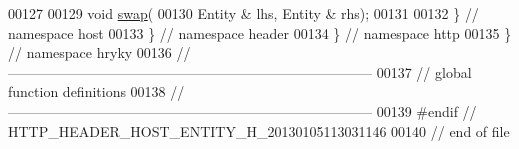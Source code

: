 \begin{DoxyCode}
00127 
00129     \textcolor{keywordtype}{void} \hyperlink{namespacehryky_1_1http_a38e62595ad532d18fbc65ceb61973aec}{swap}(
00130         Entity & lhs, Entity & rhs);
00131 
00132 \} \textcolor{comment}{// namespace host}
00133 \} \textcolor{comment}{// namespace header}
00134 \} \textcolor{comment}{// namespace http}
00135 \} \textcolor{comment}{// namespace hryky}
00136 \textcolor{comment}{//
      ------------------------------------------------------------------------------}
00137 \textcolor{comment}{// global function definitions}
00138 \textcolor{comment}{//
      ------------------------------------------------------------------------------}
00139 \textcolor{preprocessor}{#endif // HTTP\_HEADER\_HOST\_ENTITY\_H\_20130105113031146}
00140 \textcolor{preprocessor}{}\textcolor{comment}{// end of file}
\end{DoxyCode}
